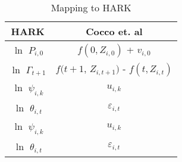 \begin{table}[h]
\centering
\caption{Mapping to HARK}
\label{tab:Mapping}
\begin{tabular}{|c|c|}
\hline
\textbf{HARK} & \textbf{Cocco et. al} \\ \hline
$\ln$ $P_{i,0}$ & $f(0,Z_{i,0})$ + $v_{i,0}$ \\ \hline
$\ln$ $\Gamma_{t+1}$ & $f(t+1$, $Z_{i,t+1})$ - $f(t,Z_{i,t})$ \\ \hline
$\ln$ $\psi_{i,k}$ & $u_{i,k}$ \\ \hline
$\ln$ $\theta_{i,t}$ & $\varepsilon_{i,t}$ \\ \hline
$\ln$ $\psi_{i,k}$ & $u_{i,k}$ \\ \hline
$\ln$ $\theta_{i,t}$ & $\varepsilon_{i,t}$ \\ \hline
\end{tabular}
\end{table}